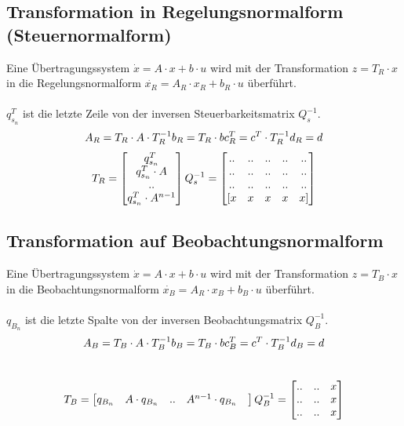 \subsection{Transformation in Regelungsnormalform (Steuernormalform)}
Eine Übertragungssystem $\dot{x}=A\cdot x +  b \cdot u$ wird mit der Transformation $z=T_R\cdot x$ in die Regelungsnormalform  $\dot{x_R}=A_R\cdot x_R +  b_R \cdot u$ überführt.\\
\\
$q_{s_n}^T$ ist die letzte Zeile von der inversen Steuerbarkeitsmatrix $Q_s^{-1}$.
\[
	A_R = T_R\cdot A \cdot T_R^{-1}	\\	b_R = T_R\cdot b	\\	c_R^T = c^T\cdot T_R^{-1}	\\	d_R = d
\]
\[
	T_R=
	\begin{bmatrix}
		q_{s_n}^T \\
		q_{s_n}^T \cdot A \\
		.. \\
		q_{s_n}^T \cdot A^{n-1}\\	
	\end{bmatrix}	\\
	Q_s^{-1} =
	\begin{bmatrix}
			.. &	.. & .. & .. & ..\\
			.. &	.. & .. & .. & ..\\
			.. &	.. & .. & .. & ..\\
			 [x &	x & x & x & x]  \\	 
	\end{bmatrix}
\]

\subsection{Transformation auf Beobachtungsnormalform}
Eine Übertragungssystem $\dot{x}=A\cdot x +  b \cdot u$ wird mit der Transformation  $z=T_B\cdot x$ in die Beobachtungsnormalform $\dot{x_B}=A_R\cdot x_B +  b_B \cdot u$ überführt.\\
\\
$q_{B_n}$ ist die letzte Spalte von der inversen Beobachtungsmatrix $Q_B^{-1}$.
\\
\[
	A_B = T_B\cdot A \cdot T_B^{-1}	\\	b_B = T_B\cdot b	\\	c_B^T = c^T\cdot T_B^{-1}	\\	d_B = d
\]
\\
\[
	T_B=
	\begin{bmatrix}
		q_{B_n} & A\cdot q_{B_n} &  ..& A^{n-1}\cdot q_{B_n} & \\
	\end{bmatrix}	\\
	Q_B^{-1} =
	\begin{bmatrix}
			 .. & .. & x\\
			 .. & .. & x\\
			 .. & .. & x\\	 
	\end{bmatrix}
\]


